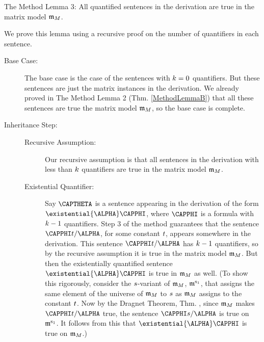 \begin{THEOREM}{ The Method Lemma 3:}
All quantified sentences in the derivation are true in the matrix model $\mathfrak{m}_M$.
\end{THEOREM}
\begin{PROOF}
We prove this lemma using a recursive proof on the number of quantifiers in each sentence.
\begin{description}
\item[Base Case:] 
The base case is the case of the sentences with $k=0$ quantifiers. 
But these sentences are just the matrix instances in the derivation. 
We already proved in The Method Lemma 2 (Thm. \ref{MethodLemmaB}) that all these sentences are true the matrix model $\mathfrak{m}_M$, so the base case is complete.

\item[Inheritance Step:] \hfill
\begin{description}
\item[Recursive Assumption:]
Our recursive assumption is that all sentences in the derivation with less than $k$ quantifiers are true in the matrix model $\mathfrak{m}_M$.

\item[Existential Quantifier:]
Say $\CAPTHETA$ is a sentence appearing in the derivation of the form $\existential{\ALPHA}\CAPPHI$, where $\CAPPHI$ is a formula with $k-1$ quantifiers. 
Step 3 of the method guarantees that the sentence $\CAPPHI\variable{t}/\ALPHA$, for some constant $t$, appears somewhere in the derivation. 
This sentence $\CAPPHI\variable{t}/\ALPHA$ has $k-1$ quantifiers, so by the recursive assumption it is true in the matrix model $\mathfrak{m}_M$. 
But then the existentially quantified sentence $\existential{\ALPHA}\CAPPHI$ is true in $\mathfrak{m}_M$ as well.
(To show this rigorously, consider the $s$-variant of $\mathfrak{m}_M$, $\mathfrak{m^{\mathrm{s_1}}_{\mathrm{}}}$, that assigns the same element of the universe of $\mathfrak{m}_M$ to $s$ as $\mathfrak{m}_M$ assigns to the constant $t$.
Now by the Dragnet Theorem, Thm. , since $\mathfrak{m}_M$ makes $\CAPPHI\variable{t}/\ALPHA$ true, the sentence $\CAPPHI\variable{s}/\ALPHA$ is true on $\mathfrak{m^{\mathrm{s_1}}_{\mathrm{}}}$.
It follows from this that $\existential{\ALPHA}\CAPPHI$ is true on $\mathfrak{m}_M$.)


\end{description}
\end{description}
\end{PROOF}
